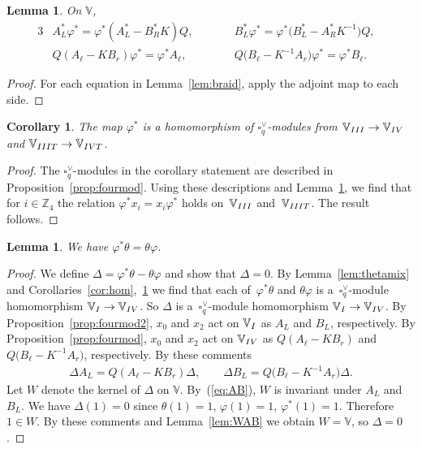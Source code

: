 \documentclass[11pt]{article}
\numberwithin{equation}{section}
\numberwithin{equation}{section}
\newtheorem{Corollary}[Theorem]{Corollary}
\newtheorem{Lemma}[Theorem]{Lemma}
\begin{document}
{\begin{Lemma}\label{lem:braiddual}On $\mathbb V$,
\begin{alignat*}{3}
& A^*_L\varphi^*=\varphi^*(A^*_L- B^*_R K)Q,\qquad &&
B^*_L \varphi^*=\varphi^* \big(B^*_L-A^*_R K^{-1}\big)Q, &\\ %
&Q(A_\ell-K B_r ) \varphi^*=\varphi^*A_\ell,\qquad && Q\big(B_\ell- K^{-1}A_r\big)
\varphi^*=\varphi^*B_\ell.&%
\end{alignat*}
\end{Lemma}
\begin{proof}For each equation in Lemma~\ref{lem:braid}, apply the adjoint map to each side.
\end{proof}

\begin{Corollary}\label{cor:hom2}The map $\varphi^*$ is a homomorphism of $\square^\vee_q$-modules from
 $\mathbb V_{\rm III} \to \mathbb V_{\rm IV}$ and $\mathbb V_{\rm IIIT} \to \mathbb V_{\rm IVT}$.
\end{Corollary}
\begin{proof}The $\square^\vee_q$-modules in the corollary statement are described in Proposition~\ref{prop:fourmod}. Using these descriptions and Lemma~\ref{lem:braiddual}, we find that for $i \in \mathbb Z_4$ the relation $ \varphi^* x_i = x_i \varphi^*$ holds on~$\mathbb V_{\rm III}$ and~$\mathbb V_{\rm IIIT}$. The result follows.
\end{proof}

\begin{Lemma}\label{lem:thphi}We have $\varphi^* \theta = \theta \varphi$.
\end{Lemma}
\begin{proof}We define $\Delta = \varphi^* \theta-\theta \varphi$ and show that $\Delta=0$. By Lemma~\ref{lem:thetamix} and Corolla\-ries~\ref{cor:hom},~\ref{cor:hom2} we find that each of~$\varphi^* \theta $ and $\theta \varphi $ is a~$\square^\vee_q$-module homomorphism $\mathbb V_{\rm I} \to \mathbb V_{\rm IV}$. So $\Delta$ is a~$\square^\vee_q$-module homomorphism $\mathbb V_{\rm I} \to \mathbb V_{\rm IV}$. By Proposition~\ref{prop:fourmod2}, $x_0$ and $x_2$ act on $\mathbb V_{\rm I}$ as $A_L$ and $B_L$, respectively. By Proposition~\ref{prop:fourmod}, $x_0$ and $x_2$ act on $\mathbb V_{\rm IV}$ as $Q (A_\ell-K B_r)$ and $Q \big(B_\ell-K^{-1} A_r\big)$, respectively. By these comments
\begin{gather}
\Delta A_L = Q (A_\ell-K B_r) \Delta,\qquad \Delta B_L = Q \big(B_\ell-K^{-1} A_r\big) \Delta.\label{eq:AB}
\end{gather}
Let $W$ denote the kernel of $\Delta$ on $\mathbb V$. By~(\ref{eq:AB}), $W$ is invariant under $A_L$ and $B_L$. We have $\Delta(1)=0$ since $\theta(1)=1$, $\varphi(1)=1$, $\varphi^*(1)=1$. Therefore $1 \in W$. By these comments and Lemma~\ref{lem:WAB} we obtain $W=\mathbb V$, so $\Delta=0$.
\end{proof}

}
\end{document}
